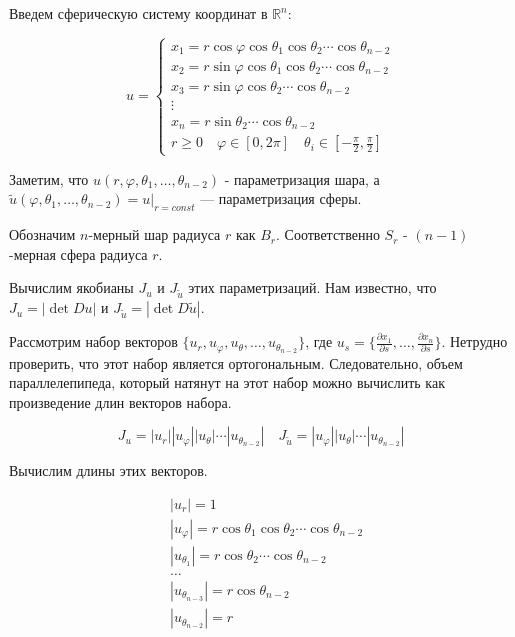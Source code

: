 \documentclass[a5paper]{article}
\theoremstyle{plain}
\theoremstyle{definition}
\numberwithin{through}{section}
\numberwithin{equation}{section}
\begin{document}
Введем сферическую систему координат в $\mathbb{R}^n$:

\begin{equation*}
	u = 
	\begin{cases}
		x_1 = r \cos \varphi \cos \theta_1 \cos \theta_2 \cdots \cos \theta_{n-2} \\
		x_2  = r \sin \varphi \cos \theta_1 \cos \theta_2 \cdots \cos \theta_{n-2} \\
		x_3 = r \sin \varphi \cos \theta_2 \cdots \cos \theta_{n-2} \\
		\vdots \\
		x_n = r \sin \theta_2 \cdots \cos \theta_{n-2} \\
		
		r \geq 0 \quad \varphi \in [0, 2\pi] \quad \theta_i \in [-\frac{\pi}{2}, \frac{\pi}{2}]
	\end{cases}
\end{equation*}

Заметим, что $u(r, \varphi, \theta_1, \ldots, \theta_{n-2})$ - параметризация шара, а $\tilde{u}(\varphi, \theta_1, \ldots, \theta_{n-2})=u|_{r=const}$ --- параметризация сферы.

Обозначим $n$-мерный шар радиуса $r$ как $B_r$. Соответственно $S_r$ - $(n-1)$-мерная сфера радиуса $r$.

Вычислим якобианы $J_u$ и $J_{\tilde{u}}$ этих параметризаций. Нам известно, что $J_u = |\det Du|$ и $J_{\tilde{u}} = |\det D \tilde{u}|$. 

Рассмотрим набор векторов $\{u_r, u_{\varphi}, u_{\theta}, \ldots, u_{\theta_{n-2}} \}$, где $u_s=\{ \frac{\partial x_1}{\partial s}, \ldots, \frac{\partial x_n}{\partial s} \}$. Нетрудно проверить, что этот набор является ортогональным. Следовательно, объем параллелепипеда, который натянут на этот набор можно вычислить как произведение длин векторов набора.

\begin{equation*}
	J_u =|u_r||u_{\varphi}||u_{\theta}|\cdots|u_{\theta_{n-2}}| \quad
		J_{\tilde{u}} =|u_{\varphi}||u_{\theta}|\cdots|u_{\theta_{n-2}}|
\end{equation*}

Вычислим длины этих векторов.

\begin{align*}
	& |u_r| =  1 \\
	& |u_{\varphi}| = r \cos \theta_1 \cos \theta_2 \cdots \cos \theta_{n-2} \\
	& |u_{\theta_1}| = r \cos \theta_2 \cdots \cos \theta_{n-2} \\
 & 	\ldots\\
	& |u_{\theta_{n-3}}|  = r \cos \theta_{n-2} \\
	& |u_{\theta_{n-2}}| = r
\end{align*}
\end{document}
